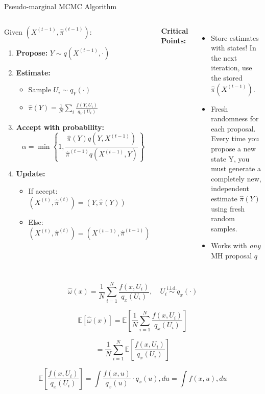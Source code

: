 \begin{frame}{Pseudo-marginal MCMC Algorithm}
	\begin{columns}

		\begin{block}{Given $(X^{(t-1)}, \hat{\pi}^{(t-1)})$:}
			\begin{enumerate}
				\item \textbf{Propose:} $Y \sim q(X^{(t-1)}, \cdot)$
				\item \textbf{Estimate:}
				      \begin{itemize}
					      \item Sample $U_i \sim q_Y(\cdot)$
					      \item $\hat{\pi}(Y) = \frac{1}{N}\sum_{i} \frac{f(Y,U_i)}{q_Y(U_i)}$
				      \end{itemize}
				\item \textbf{Accept with probability:}
				      $$\alpha = \min\left\{1, \frac{\hat{\pi}(Y)q(Y,X^{(t-1)})}{\hat{\pi}^{(t-1)}q(X^{(t-1)},Y)}\right\}$$
				\item \textbf{Update:}
				      \begin{itemize}
					      \item If accept: $(X^{(t)}, \hat{\pi}^{(t)}) = (Y, \hat{\pi}(Y))$
					      \item Else: $(X^{(t)}, \hat{\pi}^{(t)}) = (X^{(t-1)}, \hat{\pi}^{(t-1)})$
				      \end{itemize}
			\end{enumerate}
		\end{block}

		\textcolor{copenhagenred}{\textbf{Critical Points:}}
		\begin{itemize}
			\item Store estimates with states! In the next iteration, use the stored $\hat{\pi}(X^{(t-1)})$.
			\item Fresh randomness for each proposal. Every time you propose a new state Y, you must generate a completely new, independent estimate $\hat{\pi}(Y)$ using fresh random samples.
			\item Works with \textit{any} MH proposal $q$
		\end{itemize}

	\end{columns}
\end{frame}


\begin{frame}
$$\hat{\omega}(x) = \frac{1}{N} \sum_{i=1}^{N} \frac{f(x, U_i)}{q_x(U_i)}, \quad U_i \overset{\text{i.i.d.}}{\sim} q_x(\cdot)$$



$$\mathbb{E}[\hat{\omega}(x)] = \mathbb{E}\left[\frac{1}{N} \sum_{i=1}^{N} \frac{f(x, U_i)}{q_x(U_i)}\right]$$


$$= \frac{1}{N} \sum_{i=1}^{N} \mathbb{E}\left[\frac{f(x, U_i)}{q_x(U_i)}\right]$$

$$\mathbb{E}\left[\frac{f(x, U_i)}{q_x(U_i)}\right] = \int \frac{f(x, u)}{q_x(u)} \cdot q_x(u) , du = \int f(x, u) , du$$
\end{frame}
